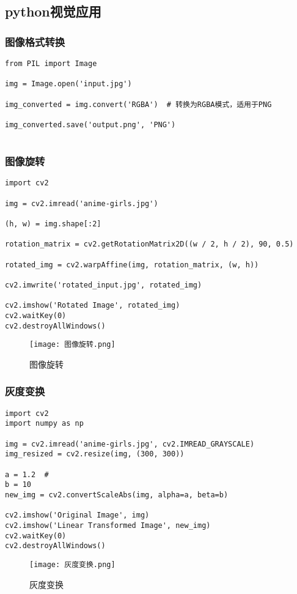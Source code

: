 \documentclass{ctexart}
\begin{document}
\subsection{python视觉应用}
\subsubsection{图像格式转换}
\begin{lstlisting}
from PIL import Image

img = Image.open('input.jpg')

img_converted = img.convert('RGBA')  # 转换为RGBA模式，适用于PNG

img_converted.save('output.png', 'PNG')


\end{lstlisting}

\subsubsection{图像旋转}
\begin{lstlisting}
import cv2

img = cv2.imread('anime-girls.jpg')

(h, w) = img.shape[:2]

rotation_matrix = cv2.getRotationMatrix2D((w / 2, h / 2), 90, 0.5)

rotated_img = cv2.warpAffine(img, rotation_matrix, (w, h))

cv2.imwrite('rotated_input.jpg', rotated_img)

cv2.imshow('Rotated Image', rotated_img)
cv2.waitKey(0)
cv2.destroyAllWindows()

\end{lstlisting}
\begin{figure}
    \centering
    \texttt{[image: 图像旋转.png]}
    \caption{图像旋转}
    \label{fig:enter-label}
\end{figure}

\subsubsection{灰度变换}
\begin{lstlisting}
import cv2
import numpy as np

img = cv2.imread('anime-girls.jpg', cv2.IMREAD_GRAYSCALE)
img_resized = cv2.resize(img, (300, 300))

a = 1.2  #
b = 10   
new_img = cv2.convertScaleAbs(img, alpha=a, beta=b)

cv2.imshow('Original Image', img)
cv2.imshow('Linear Transformed Image', new_img)
cv2.waitKey(0)
cv2.destroyAllWindows()

\end{lstlisting}
\begin{figure}[H]
    \centering
    \texttt{[image: 灰度变换.png]}
    \caption{灰度变换}
    \label{fig:enter-label}
\end{figure}
\end{document}
